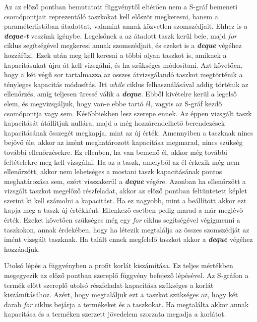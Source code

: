 Az az előző pontban bemutatott függvénytől eltérően nem a S-gráf bemeneti csomópontjait reprezentáló taszkokat kell először megkeresni, hanem a paraméterlistában átadottat, valamint annak közvetlen szomszédjait. Ehhez is a \textbf{\textit{deque-t}} veszünk igénybe. Legelsőnek a az átadott taszk kerül bele, majd \textit{for} ciklus segítségével megkeresi annak szomszédjait, és ezeket is a \textbf{\textit{deque}} végéhez hozzáfűzi. Ezek után meg kell keresni a többi olyan taszkot is, amiknek a kapacitásukat újra át kell vizsgálni, és ha szükséges módosítani. Azt követően, hogy a két végű sor tartalmazza az összes átvizsgálandó taszkot megtörténik a tényleges kapacitás módosítás. Itt \textit{while} ciklus felhasználásával addig történik az ellenőrzés, amíg teljesen üressé válik a \textbf{\textit{deque}}. Ebből kivételre kerül a legelső elem, és megvizsgáljuk, hogy van-e ebbe tartó él, vagyis az S-gráf kezdő csomópontja vagy sem. Későbbiekben lesz szerepe ennek. Az éppen vizsgált taszk kapacitását átállítjuk nullára, majd a még hozzárendelhető berendezések kapacitásának összegét megkapja, mint az új érték. Amennyiben a taszknak nincs bejövő éle, akkor az imént meghatározott kapacitása megmarad, nincs szükség további ellenőrzésekre. Ez ellenben, ha van bemenő él, akkor még további feltételekre meg kell vizsgálni. Ha az a taszk, amelyből az él érkezik még nem ellenőrzött, akkor nem lehetséges a mostani taszk kapacitásának pontos meghatározása sem, ezért visszakerül a \textbf{\textit{deque}} végére. Azonban ha ellenőrzött a vizsgált taszkot megelőző részfeladat, akkor az előző pontban feltüntetett képlet szerint ki kell számolni a kapacitást. Ha ez nagyobb, mint a beállított akkor ezt kapja meg a taszk új értékként. Ellenkező esetben pedig marad a már meglévő érték. Ezeket követően szükséges még egy \textit{for} ciklus segítségével végigmenni a taszkokon, annak érdekében, hogy ha létezik megtalálja az összes szomszédját az imént vizsgált taszknak. Ha talált ennek megfelelő taszkot akkor a \textbf{\textit{deque}} végéhez hozzáadjuk.

Utolsó lépés a függvényben a profit korlát kiszámítása. Ez teljes mértékben megegyezik az előző pontban szereplő függvény befejező lépésével. Az S-gráfon a termék előtt szereplő utolsó részfeladat kapacitása szükséges a korlát kiszámításához. Azért, hogy megtaláljuk ezt a taszkot szükséges az, hogy két darab \textit{for} ciklus bejárja a termékeket és a taszkokat. Ha megtalálta akkor annak kapacitása és a terméken szerzett jövedelem szorzata megadja a korlátot.

